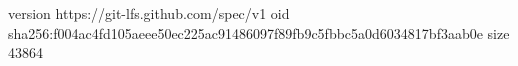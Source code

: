version https://git-lfs.github.com/spec/v1
oid sha256:f004ac4fd105aeee50ec225ac91486097f89fb9c5fbbc5a0d6034817bf3aab0e
size 43864
